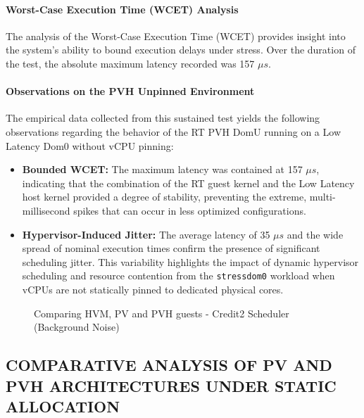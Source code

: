 \paragraph{Worst-Case Execution Time (WCET)
Analysis}\label{worst-case-execution-time-wcet-analysis-28}

The analysis of the Worst-Case Execution Time (WCET) provides insight
into the system's ability to bound execution delays under stress. Over
the duration of the test, the absolute maximum latency recorded was 157
$\mu s$.

\paragraph{Observations on the PVH Unpinned
Environment}\label{observations-on-the-pvh-unpinned-environment}

The empirical data collected from this sustained test yields the
following observations regarding the behavior of the RT PVH DomU running
on a Low Latency Dom0 without vCPU pinning:

\begin{itemize}
\item
  \textbf{Bounded WCET:} The maximum latency was contained at 157 $\mu s$,
  indicating that the combination of the RT guest kernel and the Low
  Latency host kernel provided a degree of stability, preventing the
  extreme, multi-millisecond spikes that can occur in less optimized
  configurations.
\item
  \textbf{Hypervisor-Induced Jitter:} The average latency of 35 $\mu s$ and
  the wide spread of nominal execution times confirm the presence of
  significant scheduling jitter. This variability highlights the impact
  of dynamic hypervisor scheduling and resource contention from the
  \texttt{stressdom0} workload when vCPUs are not statically pinned to
  dedicated physical cores.
\end{itemize}

\begin{figure}
\centering

\caption{Comparing HVM, PV and PVH guests - Credit2 Scheduler
(Background Noise)}
\end{figure}

\subsection{COMPARATIVE ANALYSIS OF PV AND PVH ARCHITECTURES UNDER
STATIC
ALLOCATION}\label{comparative-analysis-of-pv-and-pvh-architectures-under-static-allocation}


